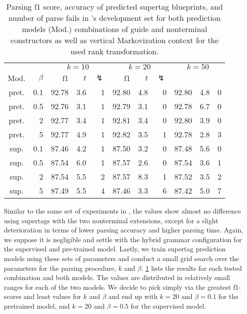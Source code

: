 \documentclass[../../document.tex]{subfiles}
\begin{document}
    \begin{table}
        \caption{\label{tbl:experiments:tiger:k}
        Parsing f1 score, accuracy of predicted  supertag blueprints, and number of parse fails in \tiger{}'s development set for both prediction models (Mod.) combinations of guide and nonterminal constructors as well as vertical Markovization context for the used rank transformation.
        }
        \centering
        \setlength{\tabcolsep}{4pt}
        \vspace{.2cm}
        \begin{tabular}{cr|rrr|rrr|rrr}
            \toprule
&      &      \multicolumn{3}{c|}{$k = 10$} & \multicolumn{3}{c|}{$k = 20$} & \multicolumn{3}{c}{$k = 50$} \\
Mod. &  $\beta$  & f1 & $t$ & $\lightning$ & f1 & $t$ & $\lightning$ \\ \hline
pret. & 0.1  & 92.78 & 3.6 & 1 & 92.80 & 4.8 & 0 & 92.80 & 4.8 & 0 \\
pret. & 0.5  & 92.76 & 3.1 & 1 & 92.79 & 3.1 & 0 & 92.78 & 6.7 & 0 \\
pret. &   2  & 92.77 & 3.4 & 1 & 92.81 & 3.4 & 0 & 92.80 & 3.9 & 0 \\
pret. &   5  & 92.77 & 4.9 & 1 & 92.82 & 3.5 & 1 & 92.78 & 2.8 & 3 \\
\midrule 
sup. & 0.1  & 87.46 & 4.2 & 1 & 87.50 & 3.2 & 0 & 87.48 & 5.6 & 0 \\
sup. & 0.5  & 87.54 & 6.0 & 1 & 87.57 & 2.6 & 0 & 87.54 & 3.6 & 1 \\
sup. &   2  & 87.54 & 5.5 & 2 & 87.57 & 8.3 & 1 & 87.52 & 3.5 & 2 \\
sup. &   5  & 87.49 & 5.5 & 4 & 87.46 & 3.3 & 6 & 87.42 & 5.0 & 7 \\
    \bottomrule
        \end{tabular}
    \end{table}

    Similar to the same set of experiments in , the values show almost no difference using  supertags with the two nonterminal extensions, except for a slight deterioration in terms of lower parsing accuracy and higher parsing time.
    Again, we suppose it is negligible and settle with the hybrid grammar configuration for the supervised and pre-trained model.
    Lastly, we train supertag prediction models using these sets of parameters and conduct a small grid search over the parameters for the parsing procedure, $k$ and $\beta$.
    \cref{tbl:experiments:tiger:k} lists the results for each tested combination and both models.
    The values are distributed in relatively small ranges for each of the two models.
    We decide to pick simply via the greatest f1-scores and least values for \(k\) and \(\beta\) and end up with \(k=20\) and \(\beta=0.1\) for the pretrained model, and \(k=20\) and \(\beta=0.5\) for the supervised model.
\end{document}
